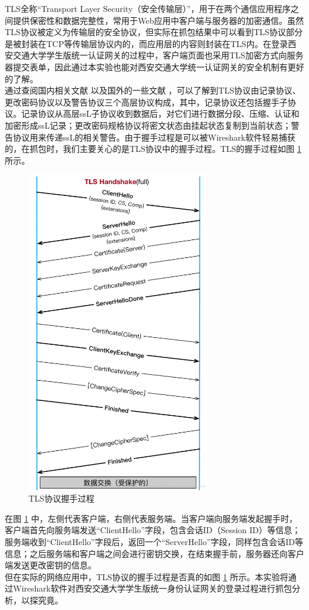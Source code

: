 \qquad 
TLS全称“Transport Layer Security（安全传输层）”，用于在两个通信应用程序之间提供保密性和数据完整性，常用于Web应用中客户端与服务器的加密通信。虽然TLS协议被定义为传输层的安全协议，但实际在抓包结果中可以看到TLS协议部分是被封装在TCP等传输层协议内的，而应用层的内容则封装在TLS内。在登录西安交通大学学生版统一认证网关的过程中，客户端页面也采用TLS加密方式向服务器提交表单，因此通过本实验也能对西安交通大学统一认证网关的安全机制有更好的了解。\\
\qquad
通过查阅国内相关文献 \cite{TLS-1} 以及国外的一些文献 \cite{TLS-2} ，可以了解到TLS协议由记录协议、更改密码协议以及警告协议三个高层协议构成，其中，记录协议还包括握手子协议。记录协议从高层ssL子协议收到数据后，对它们进行数据分段、压缩、认证和加密形成ssL记录；更改密码规格协议将密文状态由挂起状态复制到当前状态；警告协议用来传递ssL的相关警告。由于握手过程是可以被Wireshark软件轻易捕获的，在抓包时，我们主要关心的是TLS协议中的握手过程。TLS的握手过程如图 \ref{fig1} 所示。\\
\begin{figure}
	\centering
	\includegraphics[width=8cm]{image/TLS-Handshake}
	\caption{TLS协议握手过程 \cite{TLS-3}}
	\label{fig1}
\end{figure}
\qquad
在图 \ref{fig1} 中，左侧代表客户端，右侧代表服务端。当客户端向服务端发起握手时，客户端首先向服务端发送“ClientHello”字段，包含会话ID（Session ID）等信息；服务端收到“ClientHello”字段后，返回一个“ServerHello”字段，同样包含会话ID等信息；之后服务端和客户端之间会进行密钥交换，在结束握手前，服务器还向客户端发送更改密钥的信息。\\
\qquad
但在实际的网络应用中，TLS协议的握手过程是否真的如图 \ref{fig1} 所示。本实验将通过Wireshark软件对西安交通大学学生版统一身份认证网关的登录过程进行抓包分析，以探究竟。\\